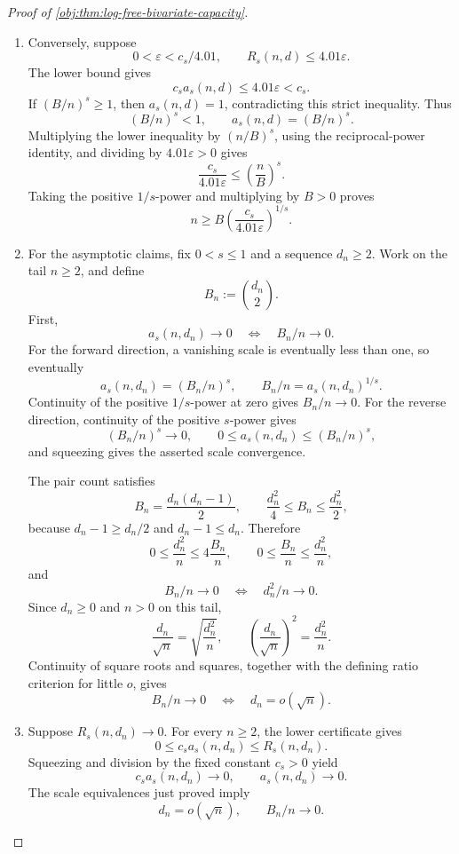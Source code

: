 \documentclass[11pt]{article}
\begin{document}
\begin{proof}[Proof of \cref{obj:thm:log-free-bivariate-capacity}]
\begin{enumerate}
\item
Conversely, suppose
\[
0<\varepsilon<c_s/4.01,
\qquad
R_s(n,d)\leq4.01\varepsilon.
\]
The lower bound gives
\[
c_sa_s(n,d)\leq4.01\varepsilon<c_s.
\]
If \((B/n)^s\geq1\), then \(a_s(n,d)=1\), contradicting this strict inequality. Thus
\[
(B/n)^s<1,
\qquad
a_s(n,d)=(B/n)^s.
\]
Multiplying the lower inequality by \((n/B)^s\), using the reciprocal-power identity, and dividing by \(4.01\varepsilon>0\) gives
\[
\frac{c_s}{4.01\varepsilon}
\leq\left(\frac nB\right)^s.
\]
Taking the positive \(1/s\)-power and multiplying by \(B>0\) proves
\[
n\geq
B\left(\frac{c_s}{4.01\varepsilon}\right)^{1/s}.
\]

\item
For the asymptotic claims, fix \(0<s\leq1\) and a sequence \(d_n\geq2\). Work on the tail \(n\geq2\), and define
\[
B_n:=\binom{d_n}{2}.
\]
First,
\[
a_s(n,d_n)\longrightarrow0
\quad\Longleftrightarrow\quad
B_n/n\longrightarrow0.
\]
For the forward direction, a vanishing scale is eventually less than one, so eventually
\[
a_s(n,d_n)=(B_n/n)^s,
\qquad
B_n/n=a_s(n,d_n)^{1/s}.
\]
Continuity of the positive \(1/s\)-power at zero gives \(B_n/n\to0\).
For the reverse direction, continuity of the positive \(s\)-power gives
\[
(B_n/n)^s\longrightarrow0,
\qquad
0\leq a_s(n,d_n)\leq(B_n/n)^s,
\]
and squeezing gives the asserted scale convergence.

The pair count satisfies
\[
B_n=\frac{d_n(d_n-1)}2,
\qquad
\frac{d_n^2}{4}\leq B_n\leq\frac{d_n^2}{2},
\]
because \(d_n-1\geq d_n/2\) and \(d_n-1\leq d_n\). Therefore
\[
0\leq\frac{d_n^2}{n}\leq4\frac{B_n}{n},
\qquad
0\leq\frac{B_n}{n}\leq\frac{d_n^2}{n},
\]
and
\[
B_n/n\longrightarrow0
\quad\Longleftrightarrow\quad
d_n^2/n\longrightarrow0.
\]
Since \(d_n\geq0\) and \(n>0\) on this tail,
\[
\frac{d_n}{\sqrt n}
=
\sqrt{\frac{d_n^2}{n}},
\qquad
\left(\frac{d_n}{\sqrt n}\right)^2
=
\frac{d_n^2}{n}.
\]
Continuity of square roots and squares, together with the defining ratio criterion for little \(o\), gives
\[
B_n/n\longrightarrow0
\quad\Longleftrightarrow\quad
d_n=o(\sqrt n).
\]

\item
Suppose \(R_s(n,d_n)\to0\). For every \(n\geq2\), the lower certificate gives
\[
0\leq c_sa_s(n,d_n)\leq R_s(n,d_n).
\]
Squeezing and division by the fixed constant \(c_s>0\) yield
\[
c_sa_s(n,d_n)\longrightarrow0,
\qquad
a_s(n,d_n)\longrightarrow0.
\]
The scale equivalences just proved imply
\[
d_n=o(\sqrt n),
\qquad
B_n/n\longrightarrow0.
\]


\end{enumerate}
\end{proof}
\end{document}
